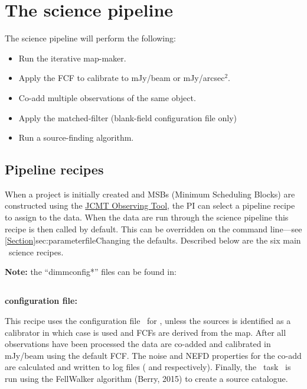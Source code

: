 \section{The science pipeline}

The science pipeline will perform the following:
\vspace{-0.3cm}
\begin{itemize}\itemsep-0.3em
\item Run the iterative map-maker.
\item Apply the FCF to calibrate to mJy/beam or mJy/arcsec$^2$.
\item Co-add multiple observations of the same object.
\item Apply the matched-filter (blank-field configuration file only)
\item Run a source-finding algorithm.
\end{itemize}

\subsection{Pipeline recipes}
\label{sec:recipes}

When a project is initially created and MSBs (Minimum Scheduling Blocks)
are constructed using the \href{https://www.eaobservatory.org/jcmt/observing/omp/observing-tool/}{JCMT Observing Tool},
the PI can select a pipeline recipe to assign
to the data. When the data are run through the science pipeline this
recipe is then called by default. This can be overridden on the command
line---see \cref{Section}{sec:parameterfile}{Changing the defaults}.
Described below are the six main \oracdr\ science recipes.

\textbf{Note:} the ``dimmconfig*'' files can be found in:

\begin{terminalv}
\end{terminalv}

\subsection{}

\textbf{configuration file: }

This recipe uses the configuration file \jsageneric\ for \makemap, unless
the sources is identified as a calibrator in which case  is used and
FCFs are derived from the map. After all observations have
been processed the data are co-added and calibrated in mJy/beam using
the default FCF. The noise and NEFD properties for the co-add are
calculated and written to log files ( and
 respectively). Finally, the \cupid\ task \findclumps\
is run using the FellWalker algorithm (Berry, 2015\cite{fellwalker}) to
create a source catalogue.

